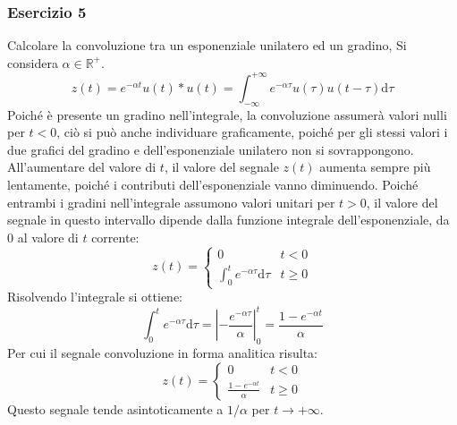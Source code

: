 \documentclass{article}
\newcommand{\df}{\mathrm{d}}
\begin{document}
\subsubsection*{Esercizio 5}

Calcolare la convoluzione tra un esponenziale unilatero ed un gradino, 
Si considera $\alpha\in\mathbb{R}^+$. 
\begin{equation*}
    z(t)=e^{-\alpha t}u(t)*u(t)=\displaystyle\int_{-\infty}^{+\infty}e^{-\alpha\tau}u(\tau)u(t-\tau)\df\tau
\end{equation*}
Poiché è presente un gradino nell'integrale, la convoluzione assumerà valori nulli per $t<0$, ciò si può anche individuare graficamente, poiché per gli stessi valori i due 
grafici del gradino e dell'esponenziale unilatero non si sovrappongono. All'aumentare del valore di $t$, il valore del segnale $z(t)$ aumenta sempre più lentamente, poiché i 
contributi dell'esponenziale vanno diminuendo. Poiché entrambi i gradini nell'integrale assumono valori unitari per $t>0$, il valore del segnale in questo intervallo 
dipende dalla funzione integrale dell'esponenziale, da $0$ al valore di $t$ corrente:
\begin{equation*}
    z(t)=\begin{cases}
        0&t<0\\
        \displaystyle\int_0^te^{-\alpha \tau}\df\tau&t\geq0
    \end{cases}
\end{equation*}
Risolvendo l'integrale si ottiene:
\begin{equation*}
    \displaystyle\int_0^te^{-\alpha \tau}\df\tau=\left|-\frac{e^{-\alpha\tau}}{\alpha}\right|^t_0=\frac{1-e^{-\alpha t}}{\alpha}
\end{equation*}
Per cui il segnale convoluzione in forma analitica risulta:
\begin{equation}
    z(t)=\begin{cases}
        0&t<0\\
        \displaystyle\frac{1-e^{-\alpha t}}{\alpha}&t\geq0
    \end{cases}
\end{equation}
Questo segnale tende asintoticamente a $1/\alpha$ per $t\to+\infty$. 
\end{document}
